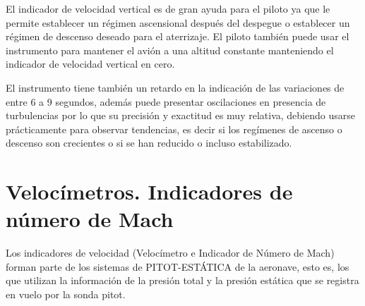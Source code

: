 \documentclass[a4paper,12pt,twoside]{article}
\begin{document}
El indicador de velocidad vertical es de gran ayuda para el piloto ya que le permite establecer un régimen ascensional después del despegue o establecer un régimen de descenso deseado para el aterrizaje. El piloto también puede usar el instrumento para mantener el avión a una altitud constante manteniendo el indicador de velocidad vertical en cero.




El instrumento tiene también un retardo en la indicación de las variaciones de entre 6 a 9 segundos, además puede presentar oscilaciones en presencia de turbulencias por lo que su precisión y exactitud es muy relativa, debiendo usarse prácticamente para observar tendencias, es decir si los regímenes de ascenso o descenso son crecientes o si se han reducido o incluso estabilizado.


\newpage



\section{Veloc\'imetros. Indicadores de n\'umero de Mach}
\label{sec:Velocimetros.Machmetros}

Los indicadores de velocidad (Velocímetro e Indicador de Número de Mach) forman parte de los sistemas de PITOT-ESTÁTICA de la aeronave, esto es, los que utilizan la información de la presión total y la presión estática que se registra en vuelo por la sonda pitot.
\end{document}
